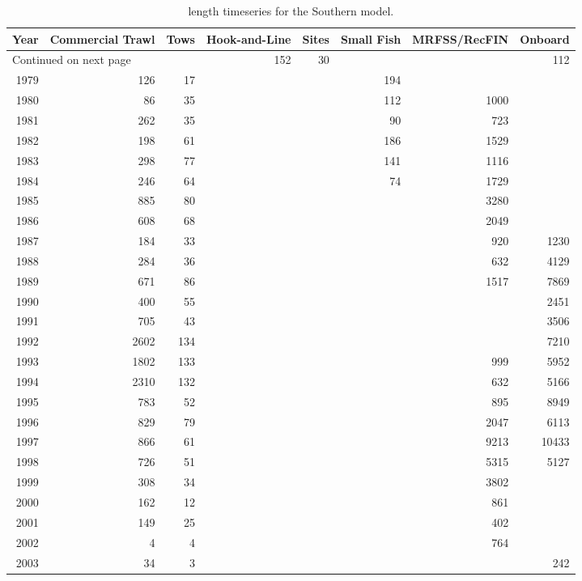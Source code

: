 \documentclass[12pt,]{article}
\begin{document}
\begin{longtable}{rrrrrrrr}
\caption{length timeseries for the Southern model.} \\ 
  \hline
Year & Commercial Trawl & Tows & Hook-and-Line & Sites & Small Fish & MRFSS/RecFIN & Onboard \\ 
  \hline 
\endhead 
\hline 
\multicolumn{3}{l}{\footnotesize Continued on next page} 
\endfoot 
\endlastfoot 
 \hline
1978 &  152 &   30 &  &  &  112 &  &  \\ 
  1979 &  126 &   17 &  &  &  194 &  &  \\ 
  1980 &   86 &   35 &  &  &  112 & 1000 &  \\ 
  1981 &  262 &   35 &  &  &   90 &  723 &  \\ 
  1982 &  198 &   61 &  &  &  186 & 1529 &  \\ 
  1983 &  298 &   77 &  &  &  141 & 1116 &  \\ 
  1984 &  246 &   64 &  &  &   74 & 1729 &  \\ 
  1985 &  885 &   80 &  &  &  & 3280 &  \\ 
  1986 &  608 &   68 &  &  &  & 2049 &  \\ 
  1987 &  184 &   33 &  &  &  &  920 & 1230 \\ 
  1988 &  284 &   36 &  &  &  &  632 & 4129 \\ 
  1989 &  671 &   86 &  &  &  & 1517 & 7869 \\ 
  1990 &  400 &   55 &  &  &  &  & 2451 \\ 
  1991 &  705 &   43 &  &  &  &  & 3506 \\ 
  1992 & 2602 &  134 &  &  &  &  & 7210 \\ 
  1993 & 1802 &  133 &  &  &  &  999 & 5952 \\ 
  1994 & 2310 &  132 &  &  &  &  632 & 5166 \\ 
  1995 &  783 &   52 &  &  &  &  895 & 8949 \\ 
  1996 &  829 &   79 &  &  &  & 2047 & 6113 \\ 
  1997 &  866 &   61 &  &  &  & 9213 & 10433 \\ 
  1998 &  726 &   51 &  &  &  & 5315 & 5127 \\ 
  1999 &  308 &   34 &  &  &  & 3802 &  \\ 
  2000 &  162 &   12 &  &  &  &  861 &  \\ 
  2001 &  149 &   25 &  &  &  &  402 &  \\ 
  2002 &    4 &    4 &  &  &  &  764 &  \\ 
  2003 &   34 &    3 &  &  &  &  &  242 \\ 

\end{longtable}
\end{document}
